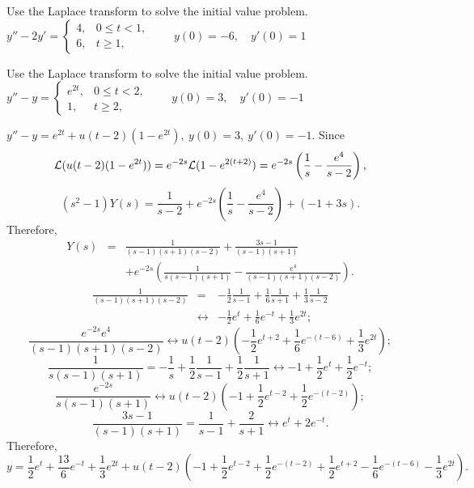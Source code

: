 \documentclass{ximera}
\begin{document}
\begin{problem}\label{exer:8.5.3} Use the Laplace transform to solve the initial value problem.
$y''-2y'= \left\{\begin{array}{cl} 4,&0\le
t<1,\\ 6,&t\ge 1,\end{array}\right.\qquad y(0)=-6,\quad y'(0)=1$
\end{problem}

\begin{problem}\label{exer:8.5.4} Use the Laplace transform to solve the initial value problem.
$y''-y=\left\{\begin{array}{cl} e^{2t},&0\le
t< 2,\\ 1,&t\ge 2,\end{array}\right.\qquad y(0)=3,\quad y'(0)=-1$

\begin{solution}
$y''-y=e^{2t}+u(t-2)(1-e^{2t}),\ y(0)=3,\ y'(0)=-1$.
Since
$$
{\cal L}(u(t-2)(1-e^{2t}))=e^{-2s}{\cal L}(1-e^{2(t+2)})=e^{-2s}
\left(\frac{1}{s}-\frac{e^4}{s-2}\right),
$$
$$
(s^2-1)Y(s)=\frac{1}{s-2}+e^{-2s}\left(\frac{1}{s}-\frac{e^4}{s-2}\right)
+(-1+3s).
$$
Therefore,
$$
\begin{array}{rcl}
Y(s)&=&\frac{1}{(s-1)(s+1)(s-2)}+\frac{3s-1}{(s-1)(s+1)}\\
&&+e^{-2s}\left(\frac{1}{s(s-1)(s+1)}-\frac{e^4}{(s-1)(s+1)(s-2)}\right).
\end{array}
$$
$$
\begin{array}{rcl}
\frac{1}{(s-1)(s+1)(s-2)}&=&-\frac{1}{2}\frac{1}{s-1}+\frac{1}{6}\frac{1}{s+1}
+\frac{1}{3}\frac{1}{s-2}\\
&\leftrightarrow& -\frac{1}{2}e^t+\frac{1}{6}e^{-t}+\frac{1}{3}e^{2t};
\end{array}
$$
$$
\frac{e^{-2s}e^4}{(s-1)(s+1)(s-2)}
\leftrightarrow u(t-2)\left(
-\frac{1}{2}e^{t+2}+\frac{1}{6}e^{-(t-6)}+\frac{1}{3}e^{2t}\right);
$$
$$
\frac{1}{s(s-1)(s+1)}=-\frac{1}{s}+\frac{1}{2}\frac{1}{s-1}
+\frac{1}{2}\frac{1}{s+1}
\leftrightarrow -1+\frac{1}{2}e^t+\frac{1}{2}e^{-t};
$$
$$
\frac{e^{-2s}}{s(s-1)(s+1)}
\leftrightarrow
u(t-2)\left(-1+\frac{1}{2}e^{t-2}+\frac{1}{2}e^{-(t-2)}\right);
$$
$$
\frac{3s-1}{(s-1)(s+1)}=\frac{1}{s-1}+\frac{2}{s+1}\leftrightarrow
e^t+2e^{-t}.
$$
Therefore,
$$
y=\frac{1}{2}e^t+\frac{13}{6}e^{-t}+ \frac{1}{3}e^{2t}
+u(t-2)\left(-1+\frac{1}{2}e^{t-2}+\frac{1}{2}e^{-(t-2)}+
\frac{1}{2}e^{t+2}-\frac{1}{6} e^{-(t-6)}-\frac{1}{3}e^{2t}\right).
$$
\end{solution}
\end{problem}
\end{document}
